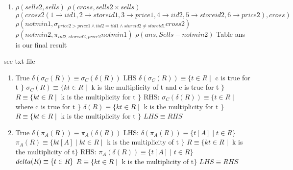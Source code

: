 \documentclass{4320hw}
\begin{document}
\begin{exercises}
\begin{enumerate}
\item
$\rho(sells2, sells)$
\newline
$\rho(cross, sells2 \times sells)$
\newline
$\rho(cross2(1 \rightarrow iid1, 2 \rightarrow storeid1, 3 \rightarrow price1, 4 \rightarrow iid2, 5 \rightarrow storeid2, 6 \rightarrow price2), cross)$
\newline
$\rho(notmin1, \sigma_{price2>price1 \wedge iid2=iid1 \wedge storeid2 \neq storeid1} cross2 )$
\newline
$\rho(notmin2, \pi_{iid2, storeid2, price2} notmin1)$
\newline
$\rho(ans, Sells-notmin2)$
\newline
Table ans is our final result
\end{enumerate}

\item
see txt file

\item
\begin{enumerate}
\item
True
\newline
$\delta(\sigma_C (R))\equiv \sigma_C(\delta (R))$
\newline
LHS
\newline
$\delta(\sigma_C (R))\equiv \{t \in R \mid$ c is true for t  $\}$
\newline
$\sigma_C (R)\equiv \{kt \in R \mid$ k is the multiplicity of t and c is true for t $\}$
\newline
$R \equiv \{kt \in R \mid$ k is the multiplicity for t $\}$
\newline
RHS:
\newline
$\sigma_C(\delta (R)) \equiv \{ t \in R \mid$ where c is true for t $\}$
\newline
$\delta (R) \equiv \{ kt \in R \mid$ k is the multiplicity for t $\}$
\newline
$R \equiv \{ kt \in R \mid$ k is the multiplicity for t $\}$
\newline
$LHS \equiv RHS$

\item
True
\newline
$\delta (\pi_A (R)) \equiv \pi_A (\delta(R)) $
\newline
LHS:
\newline
$\delta (\pi_A (R)) \equiv \{ t[A] \mid t \in R \}$
\newline
$\pi_A (R) \equiv \{ kt[A] \mid kt \in R \mid $ k is the multiplicity of t $\}$
\newline
$R \equiv \{ kt \in R \mid $ k is the multiplicity of t$\}$
\newline
RHS:
\newline
$\pi_A (\delta(R)) \equiv \{ t[A] \mid t \in R\}$
\newline
$\\delta(R) \equiv \{  t \in R \}$
\newline
$R \equiv \{ kt \in R \mid $ k is the multiplicity of t$\}$
\newline
$LHS \equiv RHS$


\end{enumerate}
\end{exercises}
\end{document}
